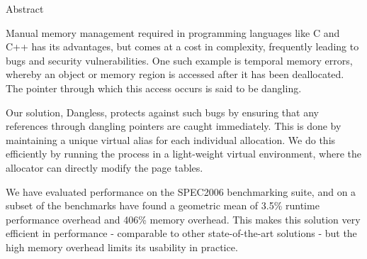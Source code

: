 Abstract

Manual memory management required in programming languages like C and C++ has its advantages, but comes at a cost in complexity, frequently leading to bugs and security vulnerabilities. One such example is temporal memory errors, whereby an object or memory region is accessed after it has been deallocated. The pointer through which this access occurs is said to be dangling.

Our solution, Dangless, protects against such bugs by ensuring that any references through dangling pointers are caught immediately. This is done by maintaining a unique virtual alias for each individual allocation. We do this efficiently by running the process in a light-weight virtual environment, where the allocator can directly modify the page tables.

We have evaluated performance on the SPEC2006 benchmarking suite, and on a subset of the benchmarks have found a geometric mean of 3.5\% runtime performance overhead and 406\% memory overhead. This makes this solution very efficient in performance - comparable to other state-of-the-art solutions - but the high memory overhead limits its usability in practice.
